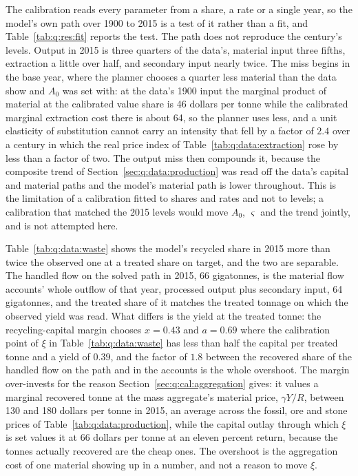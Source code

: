  The calibration reads every parameter from a share, a rate or a single year, so the model's own path over 1900 to 2015 is a test of it rather than a fit, and Table~\ref{tab:q:res:fit} reports the test. The path does not reproduce the century's levels. Output in 2015 is three quarters of the data's, material input three fifths, extraction a little over half, and secondary input nearly twice. The miss begins in the base year, where the planner chooses a quarter less material than the data show and $A_0$ was set with: at the data's 1900 input the marginal product of material at the calibrated value share is 46 dollars per tonne while the calibrated marginal extraction cost there is about 64, so the planner uses less, and a unit elasticity of substitution cannot carry an intensity that fell by a factor of $2.4$ over a century in which the real price index of Table~\ref{tab:q:data:extraction} rose by less than a factor of two. The output miss then compounds it, because the composite trend of Section~\ref{sec:q:data:production} was read off the data's capital and material paths and the model's material path is lower throughout. This is the limitation of a calibration fitted to shares and rates and not to levels; a calibration that matched the 2015 levels would move $A_0$, $\varsigma$ and the trend jointly, and is not attempted here.



 Table~\ref{tab:q:data:waste} shows the model's recycled share in 2015 more than twice the observed one at a treated share on target, and the two are separable. The handled flow on the solved path in 2015, 66 gigatonnes, is the material flow accounts' whole outflow of that year, processed output plus secondary input, 64 gigatonnes, and the treated share of it matches the treated tonnage on which the observed yield was read. What differs is the yield at the treated tonne: the recycling-capital margin chooses $x=0.43$ and $a=0.69$ where the calibration point of $\xi$ in Table~\ref{tab:q:data:waste} has less than half the capital per treated tonne and a yield of $0.39$, and the factor of $1.8$ between the recovered share of the handled flow on the path and in the accounts is the whole overshoot. The margin over-invests for the reason Section~\ref{sec:q:cal:aggregation} gives: it values a marginal recovered tonne at the mass aggregate's material price, $\gamma Y/R$, between 130 and 180 dollars per tonne in 2015, an average across the fossil, ore and stone prices of Table~\ref{tab:q:data:production}, while the capital outlay through which $\xi$ is set values it at 66 dollars per tonne at an eleven percent return, because the tonnes actually recovered are the cheap ones. The overshoot is the aggregation cost of one material showing up in a number, and not a reason to move $\xi$.


